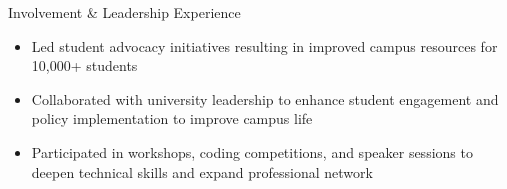 \documentclass{resume}
\begin{document}
\begin{experienceSection}{Involvement \& Leadership Experience}
    \projectItem[
        title={Student Senate Committee for Student Affairs},
    ]
    \begin{itemize}[topsep=0pt, itemsep=-6pt, leftmargin=2em, rightmargin=0.8em, before=\raggedright, after=\normalfont]
        \vspace{-0.5em}
        \item Led student advocacy initiatives resulting in improved campus resources for 10,000+ students
        \item Collaborated with university leadership to enhance student engagement and policy implementation to improve campus life
    \end{itemize}
    \vspace{-0.5em}
    \projectItem[
        title={Association for Computing Machinery},
    ]
    \begin{itemize}[topsep=0pt, itemsep=-6pt, leftmargin=2em, rightmargin=0.8em, before=\raggedright, after=\normalfont]
        \vspace{-0.5em}
        \item Participated in workshops, coding competitions, and speaker sessions to deepen technical skills and expand professional network
    \end{itemize}
\end{experienceSection}
\end{document}
